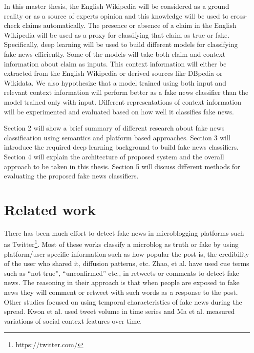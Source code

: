 \documentclass[a4paper, 11pt]{article}
\begin{document}
In this master thesis, the English Wikipedia will be considered as a ground reality or as a source of experts opinion and this knowledge will be used to cross-check claims automatically. The presence or absence of a claim in the English Wikipedia will be used as a proxy for classifying that claim as true or fake. Specifically, deep learning \parencite{Goodfellow2016} will be used to build different models for classifying fake news efficiently. Some of the models will take both claim and context information about claim as inputs. This context information will either be extracted from the English Wikipedia or derived sources like DBpedia or Wikidata. We also hypothesize that a model trained using both input and relevant context information will perform better as a fake news classifier than the model trained only with input. Different representations of context information will be experimented and evaluated based on how well it classifies fake news.

Section 2 will show a brief summary of different research about fake news classification using semantics and platform based approaches. Section 3 will introduce the required deep learning background to build fake news classifiers. Section 4 will explain the architecture of proposed system and the overall approach to be taken in this thesis. Section 5 will discuss different methods for evaluating the proposed fake news classifiers.
\section{Related work}


There has been much effort to detect fake news in microblogging platforms such as Twitter\footnote{https://twitter.com/}. Most of these works \parencite{Liu2015, Ma2015} classify a microblog as truth or fake by using platform/user-specific information such as how popular the post is, the credibility of the user who shared it, diffusion patterns, etc. Zhao, et al. \parencite{Zhao2015} have used cue terms such as \enquote{not true}, \enquote{unconfirmed} etc., in retweets or comments to detect fake news. The reasoning in their approach is that when people are exposed to fake news they will comment or retweet with such words as a response to the post. Other studies focused on using temporal characteristics of fake news during the spread. Kwon et al. \parencite{Kwon2013} used tweet volume in time series and Ma et al. \parencite{Ma2015} measured variations of social context features over time. 
\end{document}
